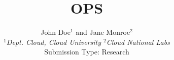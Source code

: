 \documentclass[10pt,twocolumn]{article}
\begin{document}
\title{OPS}
\author{John Doe$^1$ and Jane Monroe$^2$ \\
\small {\em  $^1$Dept. Cloud, Cloud University \quad
          $^2$Cloud National Labs} \\ [2mm]
\small Submission Type: Research
}
\date{}
\maketitle












\end{document}
